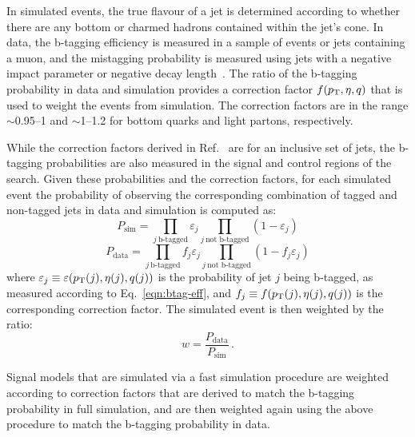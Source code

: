 In simulated events, the true flavour of a jet is determined according to 
whether there are any bottom or charmed hadrons contained within the jet's cone.
In data, the b-tagging efficiency is measured in a sample of \ttbar events or 
jets containing a muon, and the mistagging probability is measured using jets 
with a negative impact parameter or negative decay 
length~\cite{btagging-cms-run2}.
The ratio of the b-tagging probability in data and simulation provides a 
correction factor $f({p_{\text T}}, \eta, q)$ that is used to weight the events from 
simulation.
The correction factors are in the range $\sim$0.95–1 and $\sim$1–1.2 for bottom 
quarks and light partons, respectively.

While the correction factors derived in Ref.~\cite{btagging-cms-run2} are for 
an inclusive set of jets, the b-tagging probabilities are also measured in 
the signal and control regions of the search. Given these probabilities and the 
correction factors, for each simulated event the probability of observing the 
corresponding combination of tagged and non-tagged jets in data and simulation 
is computed as:
\begin{equation}
P_\text{sim} = \prod_{j~\text{b-tagged}} \varepsilon_{j} 
\prod_{j~\text{not 
b-tagged}} (1 - \varepsilon_{j})
\end{equation}
\begin{equation}
P_\text{data} = \prod_{j~\text{b-tagged}} f_{j} \varepsilon_{j} 
\prod_{j~\text{not 
b-tagged}} (1 - f_{j} \varepsilon_{j})
\end{equation}
where $\varepsilon_{j} \equiv \varepsilon({p_{\text T}}(j), \eta(j), q(j))$ is 
the probability of jet $j$ being b-tagged, as measured according to 
Eq.~\ref{eqn:btag-eff}, and $f_{j} \equiv f({p_{\text T}}(j), \eta(j), q(j))$ is 
the corresponding correction factor. 
The simulated event is then weighted by the ratio:
\begin{equation}
w = \frac{P_\text{data}}{P_\text{sim}} \, .
\end{equation}

Signal models that are simulated via a fast simulation procedure are weighted 
according to correction factors that are derived to match the b-tagging 
probability in full simulation, and are then weighted again using the above 
procedure to match the b-tagging probability in data.

